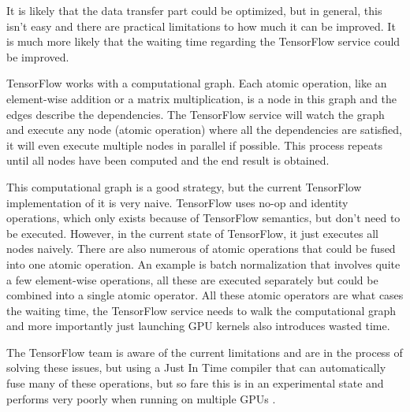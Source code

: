 It is likely that the data transfer part could be optimized, but in general, this isn't easy and there are practical limitations to how much it can be improved. It is much more likely that the waiting time regarding the TensorFlow service could be improved.

TensorFlow works with a computational graph. Each atomic operation, like an element-wise addition or a matrix multiplication, is a node in this graph and the edges describe the dependencies. The TensorFlow service will watch the graph and execute any node (atomic operation) where all the dependencies are satisfied, it will even execute multiple nodes in parallel if possible. This process repeats until all nodes have been computed and the end result is obtained.

This computational graph is a good strategy, but the current TensorFlow implementation of it is very naive. TensorFlow uses no-op and identity operations, which only exists because of TensorFlow semantics, but don't need to be executed. However, in the current state of TensorFlow, it just executes all nodes naively. There are also numerous of atomic operations that could be fused into one atomic operation. An example is batch normalization that involves quite a few element-wise operations, all these are executed separately but could be combined into a single atomic operator. All these atomic operators are what cases the waiting time, the TensorFlow service needs to walk the computational graph and more importantly just launching GPU kernels also introduces wasted time.

The TensorFlow team is aware of the current limitations and are in the process of solving these issues, but using a Just In Time compiler that can automatically fuse many of these operations, but so fare this is in an experimental state and performs very poorly when running on multiple GPUs \cite{citation-needed}.

